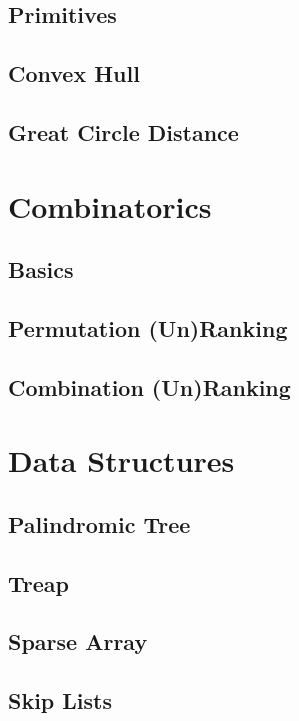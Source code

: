 		\subsection{Primitives}
			
		\subsection{Convex Hull}
			
		\subsection{Great Circle Distance}
			
	\section{Combinatorics}
		\subsection{Basics}
			
		\subsection{Permutation (Un)Ranking}
			
		\subsection{Combination (Un)Ranking}
			
	\section{Data Structures}
		\subsection{Palindromic Tree}
			
		\subsection{Treap}
			
		\subsection{Sparse Array}
			
		\subsection{Skip Lists}
			
